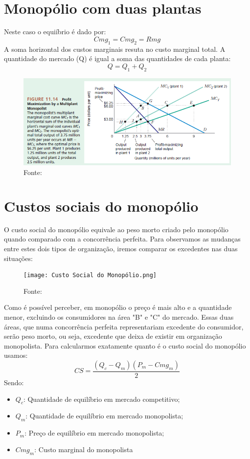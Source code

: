 \documentclass[12pt,a4paper,oneside,brazil]{abntex2}
\begin{document}
\section{Monopólio com duas plantas}
Neste caso o equiíbrio é dado por:
\[ Cmg_1 = Cmg_2 = Rmg\]
A soma horizontal dos custos marginais resuta no custo marginal total. A quantidade do mercado (Q) é igual a soma das quantidades de cada planta:
\[ Q = Q_1 + Q_2 \]
\begin{figure}[ht]
\includegraphics[scale=0.7]{Duas plantas.png}
\centering
\caption{Fonte: \cite{besanko}}
\end{figure}

\section{Custos sociais do monopólio}
O custo social do monopólio equivale ao peso morto criado pelo monopólio quando comparado com a concorrência perfeita. Para observamos as mudanças entre estes dois tipos de organização, iremos comparar os excedentes nas duas situações:

\begin{figure}
	\texttt{[image: Custo Social do Monopólio.png]}
	\centering
	\caption{Fonte: \cite[p. 371]{pindyck}}
\end{figure}
Como é possível perceber, em monopólio o preço é mais alto e a quantidade menor, excluindo os consumidores na área "B" e "C" do mercado. Essas duas áreas, que numa concorrência perfeita representariam excedente do consumidor, serão peso morto, ou seja, excedente que deixa de existir em organização monopolista. 
\clearpage
Para calcularmos exatamente quanto é o custo social do monopólio usamos:
\[ CS = \frac{(Q_c - Q_m) (P_m - Cmg_m)}{2} \]
Sendo:
\begin{itemize}
\item $Q_c$: Quantidade de equilíbrio em mercado competitivo;
\item $Q_m$: Quantidade de equilíbrio em mercado monopolista;
\item $P_m$: Preço de equilíbrio em mercado monopolista;
\item $Cmg_m$: Custo marginal do monopolista
\end{itemize}
\end{document}
